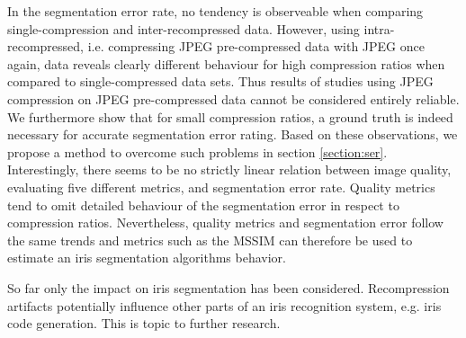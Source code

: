 \documentclass[10pt,twocolumn,letterpaper]{article}
\begin{document}
In the segmentation error rate, no tendency is observeable when comparing single-compression and inter-recompressed data. However, using intra-recompressed, i.e. compressing JPEG pre-compressed data with JPEG once again, data reveals clearly different behaviour for high compression ratios when compared to single-compressed data sets. Thus results of studies using JPEG compression on JPEG pre-compressed data cannot be considered entirely reliable. We furthermore show that for small compression ratios, a ground truth is indeed necessary for accurate segmentation error rating. Based on these observations, we propose a method to overcome such problems in section \ref{section:ser}. Interestingly, there seems to be no strictly linear relation between image quality, evaluating five different metrics, and segmentation error rate. Quality metrics tend to omit detailed behaviour of the segmentation error in respect to compression ratios. Nevertheless, quality metrics and segmentation error follow the same trends and metrics such as the MSSIM can therefore be used to estimate an iris segmentation algorithms behavior.

So far only the impact on iris segmentation has been considered. Recompression artifacts potentially influence other parts of an iris recognition system, e.g. iris code generation. This is topic to further research.           


{\small


}
\end{document}
